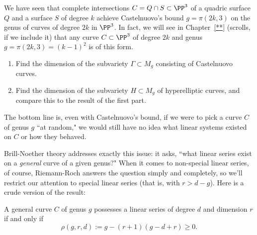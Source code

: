 \begin{exercise}
We have seen that complete intersections $C = Q \cap S \subset \PP^3$ of a quadric surface $Q$ and a surface $S$ of degree $k$ achieve Castelnuovo's bound $g = \pi(2k, 3)$ on the genus of curves of degree $2k$ in $\PP^3$. In fact, we will see in Chapter~\ref{**} (scrolls, if we include it) that any curve $C \subset \PP^3$ of degree $2k$ and genus $g = \pi(2k, 3) = (k-1)^2$ is of this form.
\begin{enumerate}
\item Find the dimension of the subvariety $\Gamma \subset M_g$ consisting of Castelnuovo curves.
\item Find the dimension of the subvariety $H \subset M_g$ of hyperelliptic curves, and compare this to the result of the first part.
\end{enumerate}
\end{exercise}

The bottom line is, even with Castelnuovo's bound, if we were to pick a curve $C$ of genus $g$ ``at random," we would still have no idea what linear systems existed on $C$ or how they behaved.

Brill-Noether theory addresses exactly this issue: it asks, ``what linear series exist on a \emph{general} curve of a given genus?" When it comes to non-special linear series, of course, Riemann-Roch answers the question simply and completely, so we'll restrict our attention to special linear series (that is, with $r > d - g$). 
Here is a crude version of the result:

\begin{theorem}\label{basic BN}
A general curve $C$ of genus $g$  possesses a linear series of degree $d$ and dimension $r$ if and only if
$$
 \rho(g,r,d) := g - (r+1)(g-d+r) \geq 0.
$$
\end{theorem}


